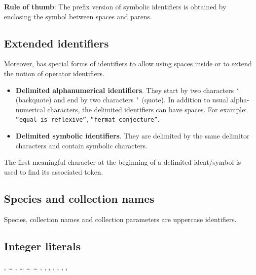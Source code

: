 {\bf Rule of thumb}: The prefix version of symbolic identifiers is obtained
by enclosing the symbol between spaces and parens.

\subsection{Extended identifiers}
\label{extended-identifiers}

Moreover, {\focal} has special forms of identifiers to allow using
spaces inside or to extend the notion of operator identifiers.
\begin{itemize}
  \item {\bf Delimited alphanumerical identifiers}.
    They start by two characters {\tt `} (backquote) and end by two
    characters {\tt '} (quote). In addition to usual alpha-numerical
    characters, the delimited identifiers can have spaces. For example:
    {\tt ``equal is reflexive''}, {\tt ``fermat conjecture''}.
  \item {\bf Delimited symbolic identifiers}.
    They are delimited by the same delimitor characters and contain
    symbolic characters.
\end{itemize}

The first meaningful character at the beginning of a delimited
ident/symbol is used to find its associated token.

\subsection{Species and collection names}
 Species, collection
names and collection parameters are uppercase identifiers.

\subsection{Integer literals}
\label{integer literals}
\label{octal}
\label{hexadecimal}
\label{binary}

\begin{syn}
 \is {} \orelse {}
\sep
{} \is {} \ldots {}
\sep
{} \is
   \ldots {}
  \orelse {} \ldots {}
  \orelse {} \ldots {}
\sep
{} \is \tok{+} \orelse \tok{-}
\sep
{} \is
   
   
\sep
{} \is
   
   
\sep
{} \is
   
\sep
{} \is
   
   
\sep
{} \is
\alt {}
\alt {}
\alt {}
\sep
{} \is
   
\end{syn}

